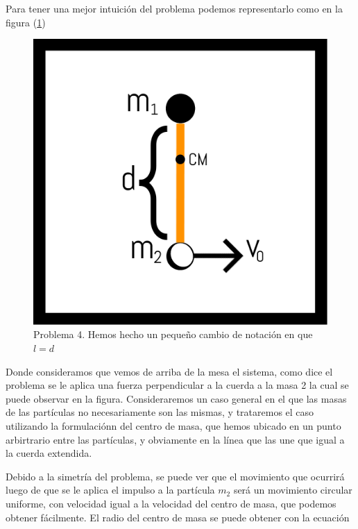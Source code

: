 \documentclass[a4paper,10pt]{article}
\begin{document}
Para tener una mejor intuición del problema podemos representarlo como en la figura (\ref{fig:problema4})

\begin{figure}[ht]
 \centering
\includegraphics[scale=0.4]{problema4fig1}
\caption{Problema 4. Hemos hecho un pequeño cambio de notación en que $l=d$}
\label{fig:problema4}
\end{figure}

Donde consideramos que vemos de arriba de la mesa el sistema, como dice el problema
se le aplica una fuerza perpendicular a la cuerda a la masa 2 la cual se puede observar
en la figura. Consideraremos un caso general en el que las masas de las partículas
no necesariamente son las mismas, y trataremos el caso utilizando la formulaciónn
del centro de masa, que hemos ubicado en un punto arbirtrario entre las partículas,
y obviamente en la línea que las une que igual a la cuerda extendida.

\vspace{.3cm}

Debido a la simetría del problema, se puede ver que el movimiento que ocurrirá
luego de que se le aplica el impulso a la partícula $m_2$ será un movimiento
circular uniforme, con velocidad igual a la velocidad del centro de masa, que podemos
obtener fácilmente. El radio del centro de masa se puede obtener con la ecuación
\end{document}

